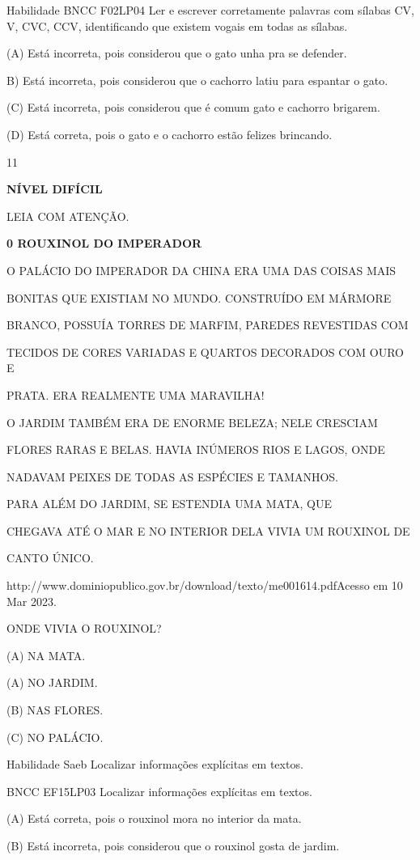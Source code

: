 {{Habilidade BNCC F02LP04 Ler e escrever corretamente palavras com sílabas
CV, V, CVC, CCV, identificando que existem vogais em todas as sílabas.

(A) Está incorreta, pois considerou que o gato unha pra se defender.

B) Está incorreta, pois considerou que o cachorro latiu para espantar o
gato.

(C) Está incorreta, pois considerou que é comum gato e cachorro
brigarem.

(D) Está correta, pois o gato e o cachorro estão felizes brincando.

\num{11}

\textbf{NÍVEL DIFÍCIL}

LEIA COM ATENÇÃO.

\textbf{0 ROUXINOL DO IMPERADOR}

O PALÁCIO DO IMPERADOR DA CHINA ERA UMA DAS COISAS MAIS

BONITAS QUE EXISTIAM NO MUNDO. CONSTRUÍDO EM MÁRMORE

BRANCO, POSSUÍA TORRES DE MARFIM, PAREDES REVESTIDAS COM

TECIDOS DE CORES VARIADAS E QUARTOS DECORADOS COM OURO E

PRATA. ERA REALMENTE UMA MARAVILHA!

O JARDIM TAMBÉM ERA DE ENORME BELEZA; NELE CRESCIAM

FLORES RARAS E BELAS. HAVIA INÚMEROS RIOS E LAGOS, ONDE

NADAVAM PEIXES DE TODAS AS ESPÉCIES E TAMANHOS.

PARA ALÉM DO JARDIM, SE ESTENDIA UMA MATA, QUE

CHEGAVA ATÉ O MAR E NO INTERIOR DELA VIVIA UM ROUXINOL DE

CANTO ÚNICO.

http://www.dominiopublico.gov.br/download/texto/me001614.pdfAcesso em 10
Mar 2023.

ONDE VIVIA O ROUXINOL?

(A) NA MATA.

(A) NO JARDIM.

(B) NAS FLORES.

(C) NO PALÁCIO.

Habilidade Saeb Localizar informações explícitas em textos.

BNCC EF15LP03 Localizar informações explícitas em textos.

(A) Está correta, pois o rouxinol mora no interior da mata.

(B) Está incorreta, pois considerou que o rouxinol gosta de jardim.

}}
